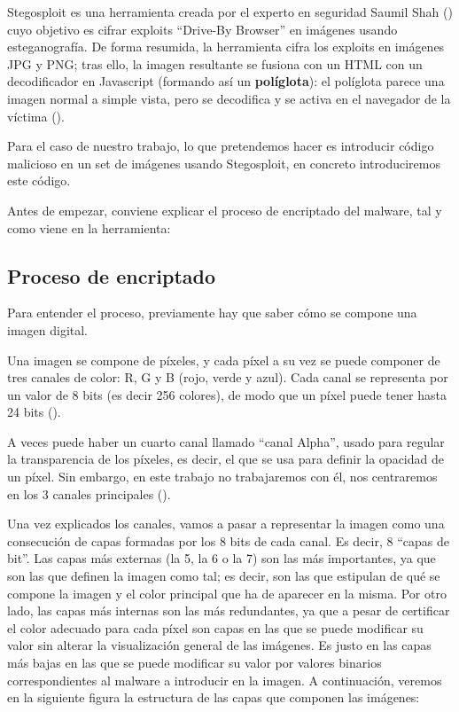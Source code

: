 Stegosploit es una herramienta creada por el experto en seguridad Saumil Shah (\cite{saumil-shah}) cuyo objetivo es cifrar exploits ``Drive-By Browser'' en imágenes usando esteganografía. De forma resumida, la herramienta cifra los exploits en imágenes JPG y PNG; tras ello, la imagen resultante se fusiona con un HTML con un decodificador en Javascript (formando así un \textbf{políglota}): el políglota parece una imagen normal a simple vista, pero se decodifica y se activa en el navegador de la víctima (\cite{stegosploit}). %

Para el caso de nuestro trabajo, lo que pretendemos hacer es introducir código malicioso en un set de imágenes usando Stegosploit, en concreto introduciremos este código.


Antes de empezar, conviene explicar el proceso de encriptado del malware, tal y como viene en la herramienta:

\subsection{Proceso de encriptado}

Para entender el proceso, previamente hay que saber cómo se compone una imagen digital.

Una imagen se compone de píxeles, y cada píxel a su vez se puede componer de tres canales de color: R, G y B (rojo, verde y azul). Cada canal se representa por un valor de 8 bits (es decir 256 colores), de modo que un píxel puede tener hasta 24 bits (\cite{pixel}). %

A veces puede haber un cuarto canal llamado ``canal Alpha'', usado para regular la transparencia de los píxeles, es decir, el que se usa para definir la opacidad de un píxel. Sin embargo, en este trabajo no trabajaremos con él, nos centraremos en los 3 canales principales (\cite{alpha-channel}). %

Una vez explicados los canales, vamos a pasar a representar la imagen como una consecución de capas formadas por los 8 bits de cada canal. Es decir, 8 ``capas de bit''. Las capas más externas (la 5, la 6 o la 7) son las más importantes, ya que son las que definen la imagen como tal; es decir, son las que estipulan de qué se compone la imagen y el color principal que ha de aparecer en la misma. Por otro lado, las capas más internas son las más redundantes, ya que a pesar de certificar el color adecuado para cada píxel son capas en las que se puede modificar su valor sin alterar la visualización general de las imágenes. Es justo en las capas más bajas en las que se puede modificar su valor por valores binarios correspondientes al malware a introducir en la imagen. A continuación, veremos en la siguiente figura la estructura de las capas que componen las imágenes:

